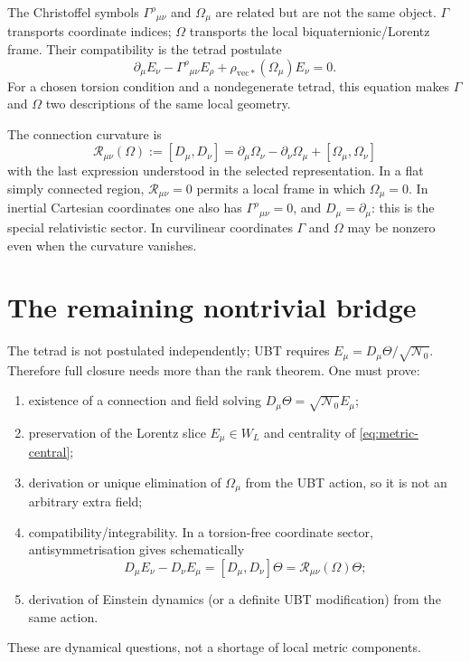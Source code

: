 \documentclass[12pt]{article}
\theoremstyle{remark}\newtheorem{remark}[definition]{Remark}
\begin{document}
The Christoffel symbols $\Gamma^\rho{}_{\mu\nu}$ and $\Omega_\mu$ are related
but are not the same object.  $\Gamma$ transports coordinate indices; $\Omega$
transports the local biquaternionic/Lorentz frame.  Their compatibility is the
tetrad postulate
\begin{equation}
 \boxed{\partial_\mu E_\nu-\Gamma^\rho{}_{\mu\nu}E_\rho
       +\rho_{\mathrm{vec}*}(\Omega_\mu)E_\nu=0.}
 \label{eq:tetrad-postulate}
\end{equation}
For a chosen torsion condition and a nondegenerate tetrad, this equation makes
$\Gamma$ and $\Omega$ two descriptions of the same local geometry.

The connection curvature is
\begin{equation}
 \mathcal R_{\mu\nu}(\Omega)
 :=[D_\mu,D_\nu]
 =\partial_\mu\Omega_\nu-\partial_\nu\Omega_\mu
  +[\Omega_\mu,\Omega_\nu]
 \label{eq:connection-curvature}
\end{equation}
with the last expression understood in the selected representation.
In a flat simply connected region, $\mathcal R_{\mu\nu}=0$ permits a local
frame in which $\Omega_\mu=0$.  In inertial Cartesian coordinates one also has
$\Gamma^\rho{}_{\mu\nu}=0$, and $D_\mu=\partial_\mu$: this is the special
relativistic sector.  In curvilinear coordinates $\Gamma$ and $\Omega$ may be
nonzero even when the curvature vanishes.

\section{The remaining nontrivial bridge}
The tetrad is not postulated independently; UBT requires
$E_\mu=D_\mu\Theta/\sqrt{\mathcal N_0}$.  Therefore full closure needs more
than the rank theorem.  One must prove:
\begin{enumerate}
 \item existence of a connection and field solving $D_\mu\Theta=\sqrt{\mathcal N_0}E_\mu$;
 \item preservation of the Lorentz slice $E_\mu\in W_L$ and centrality of
       \eqref{eq:metric-central};
 \item derivation or unique elimination of $\Omega_\mu$ from the UBT action,
       so it is not an arbitrary extra field;
 \item compatibility/integrability.  In a torsion-free coordinate sector,
       antisymmetrisation gives schematically
       \[
       D_\mu E_\nu-D_\nu E_\mu=[D_\mu,D_\nu]\Theta
       =\mathcal R_{\mu\nu}(\Omega)\Theta;
       \]
 \item derivation of Einstein dynamics (or a definite UBT modification) from
       the same action.
\end{enumerate}
These are dynamical questions, not a shortage of local metric components.
\end{document}
